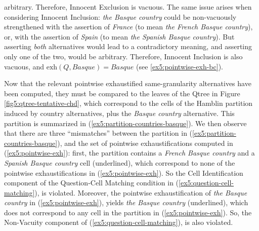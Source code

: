 arbitrary. Therefore, Innocent Exclusion is vacuous. The same issue arises when considering Innocent Inclusion: \textit{the Basque country} could be non-vacuously strengthened with the assertion of \textit{France} (to mean \textit{the French Basque country}), or, with the assertion of \textit{Spain} (to mean \textit{the Spanish Basque country}). But asserting \textit{both} alternatives would lead to a contradictory meaning, and asserting only one of the two, would be arbitrary. Therefore, Innocent Inclusion is also vacuous, and $\text{exh}(Q, \textit{Basque}) = \textit{Basque}$ (see \ref{ex5:pointwise-exh-bc}).

\begin{exe}
	\label{ex5:pointwise-exh}
\end{exe}

Now that the relevant pointwise exhaustified same-granularity alternatives have been computed, they must be compared to the leaves of the Qtree in Figure \ref{fig5:qtree-tentative-chd}, which correspond to the cells of the Hamblin partition induced by country alternatives, plus the \textit{Basque country} alternative. This partition is summarized in (\ref{ex5:partition-countries-basque}). We then observe that there are three ``mismatches'' between the partition in (\ref{ex5:partition-countries-basque}), and the set of pointwise exhaustifications computed in (\ref{ex5:pointwise-exh}): first, the partition contains a \textit{French Basque country} and a \textit{Spanish Basque country} cell (underlined), which correspond to none of the pointwise exhaustifications in (\ref{ex5:pointwise-exh}). So the Cell Identification component of the Question-Cell Matching condition in (\ref{ex5:question-cell-matching}), is violated. Moreover, the pointwise exhaustification of \textit{the Basque country} in (\ref{ex5:pointwise-exh}), yields \textit{the Basque country} (underlined), which does not correspond to any cell in the partition in (\ref{ex5:pointwise-exh}). So, the Non-Vacuity component of (\ref{ex5:question-cell-matching}), is also violated.

